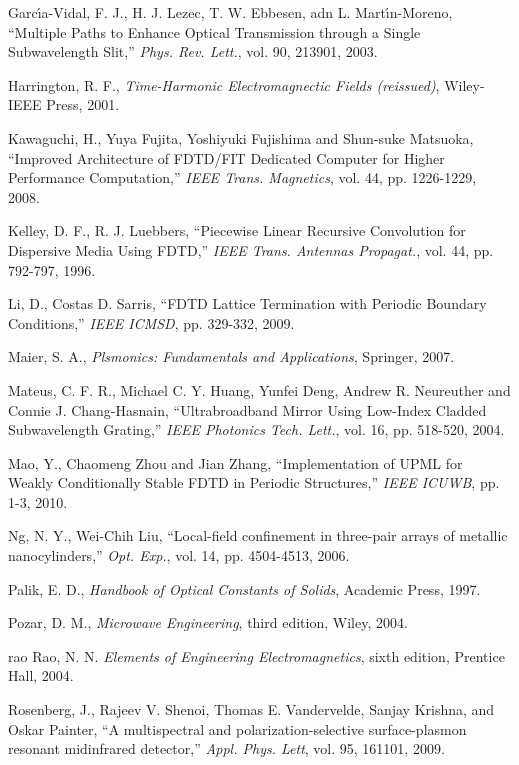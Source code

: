 \begin{thebibliography}{999}
  \bibitem
  {}
  Garc\'\i{}a-Vidal, F. J., H. J. Lezec, T. W. Ebbesen, adn L. Mart\'\i{}n-Moreno,
  ``Multiple Paths to Enhance Optical Transmission through a Single Subwavelength Slit,''
  \textit{Phys. Rev. Lett.},
  vol. 90,
  213901,
  2003.

  \bibitem
  {}
  Harrington, R. F.,
  \textit{Time-Harmonic Electromagnectic Fields (reissued)},
  Wiley-IEEE Press,
  2001.

  \bibitem
  {}
  Kawaguchi, H., Yuya Fujita, Yoshiyuki Fujishima and Shun-suke Matsuoka,
  ``Improved Architecture of FDTD/FIT Dedicated Computer for Higher Performance Computation,''
  \textit{IEEE Trans. Magnetics},
  vol. 44,
  pp. 1226-1229,
  2008.

  \bibitem
  {}
  Kelley, D. F., R. J. Luebbers,
  ``Piecewise Linear Recursive Convolution for Dispersive Media Using FDTD,''
  \textit{IEEE Trans. Antennas Propagat.},
  vol. 44,
  pp. 792-797,
  1996.

  \bibitem
  {}
  Li, D., Costas D. Sarris,
  ``FDTD Lattice Termination with Periodic Boundary Conditions,''
  \textit{IEEE ICMSD},
  pp. 329-332,
  2009.

  \bibitem
  {}
  Maier, S. A.,
  \textit{Plsmonics: Fundamentals and Applications},
  Springer,
  2007.

  \bibitem
  {}
  Mateus, C. F. R., Michael C. Y. Huang, Yunfei Deng, Andrew R. Neureuther and Connie J. Chang-Hasnain,
  ``Ultrabroadband Mirror Using Low-Index Cladded Subwavelength Grating,''
  \textit{IEEE Photonics Tech. Lett.},
  vol. 16,
  pp. 518-520,
  2004.

  \bibitem
  {}
  Mao, Y., Chaomeng Zhou and Jian Zhang,
  ``Implementation of UPML for Weakly Conditionally Stable FDTD in Periodic Structures,''
  \textit{IEEE ICUWB},
  pp. 1-3,
  2010.

  \bibitem
  {}
  Ng, N. Y., Wei-Chih Liu,
  ``Local-field confinement in three-pair arrays of metallic nanocylinders,''
  \textit{Opt. Exp.},
  vol. 14,
  pp. 4504-4513,
  2006.

  \bibitem
  {}
  Palik, E. D.,
  \textit{Handbook of Optical Constants of Solids},
  Academic Press,
  1997.

  \bibitem
  {}
  Pozar, D. M.,
  \textit{Microwave Engineering}, third edition,
  Wiley,
  2004.

  \bibitem
  {rao} 
  Rao, N. N.
  \textit{Elements of Engineering Electromagnetics}, sixth edition,
  Prentice Hall,
  2004.

  \bibitem
  {}
  Rosenberg, J., Rajeev V. Shenoi, Thomas E. Vandervelde, Sanjay Krishna, and Oskar Painter,
  ``A multispectral and polarization-selective surface-plasmon resonant midinfrared detector,''
  \textit{Appl. Phys. Lett},
  vol. 95,
  161101,
  2009.


\end{thebibliography}
